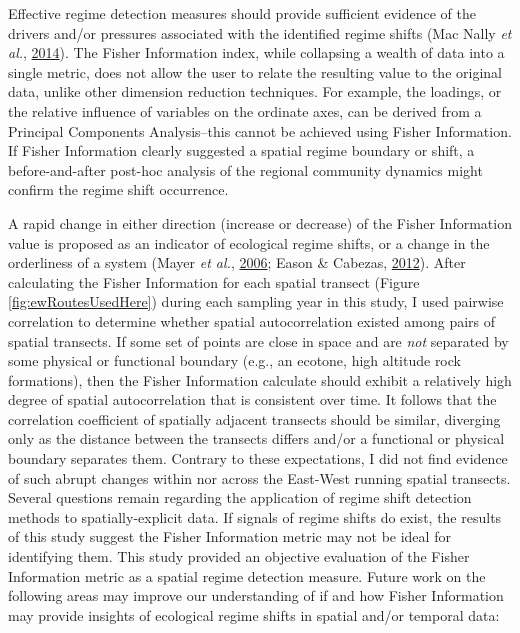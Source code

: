 \documentclass[12pt,twoside,openany]{reedthesis}
\begin{document}
Effective regime detection measures should provide sufficient evidence of the drivers and/or pressures associated with the identified regime shifts (Mac Nally \emph{et al.}, \protect\hyperlink{ref-mac2014scrutiny}{2014}). The Fisher Information index, while collapsing a wealth of data into a single metric, does not allow the user to relate the resulting value to the original data, unlike other dimension reduction techniques. For example, the loadings, or the relative influence of variables on the ordinate axes, can be derived from a Principal Components Analysis--this cannot be achieved using Fisher Information. If Fisher Information clearly suggested a spatial regime boundary or shift, a before-and-after post-hoc analysis of the regional community dynamics might confirm the regime shift occurrence.

A rapid change in either direction (increase or decrease) of the Fisher Information value is proposed as an indicator of ecological regime shifts, or a change in the orderliness of a system (Mayer \emph{et al.}, \protect\hyperlink{ref-mayer_fisher_2006}{2006}; Eason \& Cabezas, \protect\hyperlink{ref-eason_evaluating_2012}{2012}). After calculating the Fisher Information for each spatial transect (Figure \ref{fig:ewRoutesUsedHere}) during each sampling year in this study, I used pairwise correlation to determine whether spatial autocorrelation existed among pairs of spatial transects. If some set of points are close in space and are \emph{not} separated by some physical or functional boundary (e.g., an ecotone, high altitude rock formations), then the Fisher Information calculate should exhibit a relatively high degree of spatial autocorrelation that is consistent over time. It follows that the correlation coefficient of spatially adjacent transects should be similar, diverging only as the distance between the transects differs and/or a functional or physical boundary separates them. Contrary to these expectations, I did not find evidence of such abrupt changes within nor across the East-West running spatial transects. Several questions remain regarding the application of regime shift detection methods to spatially-explicit data. If signals of regime shifts do exist, the results of this study suggest the Fisher Information metric may not be ideal for identifying them. This study provided an objective evaluation of the Fisher Information metric as a spatial regime detection measure. Future work on the following areas may improve our understanding of if and how Fisher Information may provide insights of ecological regime shifts in spatial and/or temporal data:
\end{document}
